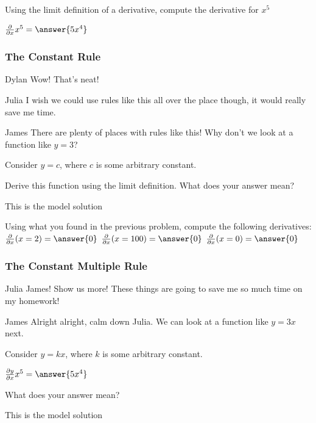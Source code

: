 \documentclass{ximera}
\begin{document}
\begin{question}
Using the limit definition of a derivative, compute the derivative for $x^5$

$ \frac{\partial}{\partial x} x^5 =  \answer{5x^4}$
\end{question}

\subsubsection{The Constant Rule}
\begin{dialogue}
\item[Dylan] Wow! That's neat!
\item[Julia] I wish we could use rules like this all over the place though, it would really save me time.
\item[James] There are plenty of places with rules like this! Why don't we look at a function like $y = 3$?
\end{dialogue}

Consider $y = c$, where $c$ is some arbitrary constant.
\begin{question}
Derive this function using the limit definition. What does your answer mean?
\begin{freeResponse}
This is the model solution %
\end{freeResponse}
\end{question}

\begin{question}
Using what you found in the previous problem, compute the following derivatives:
$ \frac{\partial}{\partial x}(x=2) =  \answer{0}$
$ \frac{\partial}{\partial x}(x=100) =  \answer{0}$
$ \frac{\partial}{\partial x}(x=0) =  \answer{0}$
\end{question}

\subsubsection{The Constant Multiple Rule}
\begin{dialogue}
\item[Julia] James! Show us more! These things are going to save me so much time on my homework!
\item[James] Alright alright, calm down Julia. We can look at a function like $y = 3x$ next.
\end{dialogue}

Consider $y = kx$, where $k$ is some arbitrary constant.
\begin{question}
$ \frac{\partial y}{\partial x} x^5 =  \answer{5x^4}$
\item{What does your answer mean?}
\begin{freeResponse}
This is the model solution %
\end{freeResponse}
\end{question}
\end{document}
